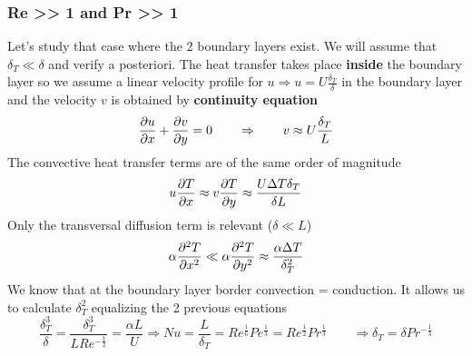 	\subsubsection{Re >> 1 and Pr >> 1}
		Let's study that case where the 2 boundary layers exist. We will assume that $\delta _T \ll \delta$ and verify a posteriori. The heat transfer takes place \textbf{inside} the boundary layer so we assume a linear velocity profile for $u \Rightarrow u = U\frac{\delta _T}{\delta}$ in the boundary layer and the velocity $v$ is obtained by \textbf{continuity equation}
		\begin{equation}
			\frac{\partial u}{\partial x} + \frac{\partial v}{\partial y} = 0 \qquad \Rightarrow \qquad v \approx U\frac{\delta _T}{L}
		\end{equation}
		The convective heat transfer terms are of the same order of magnitude 
		\begin{equation}
			u\frac{\partial T}{\partial x} \approx v\frac{\partial T}{\partial y} \approx \frac{U\Delta T \delta _T}{\delta L}
		\end{equation}
		Only the transversal diffusion term is relevant ($\delta \ll L$)
		\begin{equation}
			\alpha \frac{\partial ^2 T}{\partial x^2} \ll \alpha \frac{\partial ^2 T}{\partial y^2} \approx \frac{\alpha \Delta T}{\delta _T ^2}
		\end{equation}
		We know that at the boundary layer border convection = conduction. It allows us to calculate $\delta _T^2$ equalizing the 2 previous equations
		\begin{equation}
			\frac{\delta _T^3}{\delta} = \frac{\delta _T^3}{LRe^{-\frac{1}{2}}} = \frac{\alpha L}{U} \Rightarrow Nu = \frac{L}{\delta _T} =  Re^{\frac{1}{6}} Pe^{\frac{1}{3}} = Re^{\frac{1}{2}} Pr^{\frac{1}{3}} \qquad \Rightarrow  \delta _T = \delta Pr^{-\frac{1}{3}}
		\end{equation}
		
